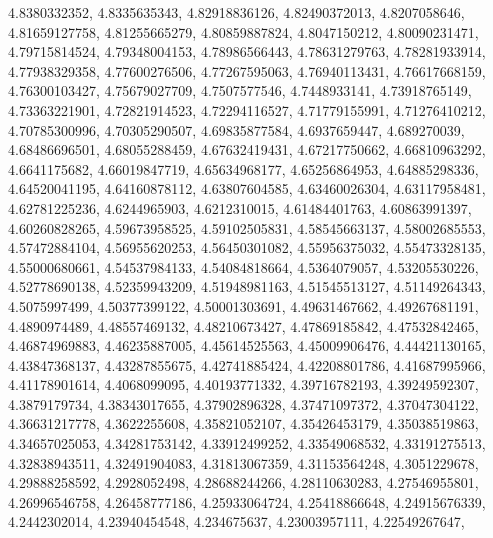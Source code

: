 \begin{code}
\begin{hide}
{      4.8380332352,      4.8335635343,     4.82918836126,
     4.82490372013,      4.8207058646,     4.81659127758,
     4.81255665279,     4.80859887824,      4.8047150212,
     4.80090231471,     4.79715814524,     4.79348004153,
     4.78986566443,     4.78631279763,     4.78281933914,
     4.77938329358,     4.77600276506,     4.77267595063,
     4.76940113431,     4.76617668159,     4.76300103427,
     4.75679027709,      4.7507577546,      4.7448933141,
     4.73918765149,     4.73363221901,     4.72821914523,
     4.72294116527,     4.71779155991,     4.71276410212,
     4.70785300996,     4.70305290507,     4.69835877584,
      4.6937659447,       4.689270039,     4.68486696501,
     4.68055288459,     4.67632419431,     4.67217750662,
     4.66810963292,      4.6641175682,     4.66019847719,
     4.65634968177,     4.65256864953,     4.64885298336,
     4.64520041195,     4.64160878112,     4.63807604585,
     4.63460026304,     4.63117958481,     4.62781225236,
      4.6244965903,      4.6212310015,     4.61484401763,
     4.60863991397,     4.60260828265,     4.59673958525,
     4.59102505831,     4.58545663137,     4.58002685553,
     4.57472884104,     4.56955620253,     4.56450301082,
     4.55956375032,     4.55473328135,     4.55000680661,
     4.54537984133,     4.54084818664,      4.5364079057,
     4.53205530226,     4.52778690138,     4.52359943209,
     4.51948981163,     4.51545513127,     4.51149264343,
      4.5075997499,     4.50377399122,     4.50001303691,
     4.49631467662,     4.49267681191,      4.4890974489,
     4.48557469132,     4.48210673427,     4.47869185842,
     4.47532842465,     4.46874969883,     4.46235887005,
     4.45614525563,     4.45009906476,     4.44421130165,
     4.43847368137,     4.43287855675,     4.42741885424,
     4.42208801786,     4.41687995966,     4.41178901614,
      4.4068099095,     4.40193771332,     4.39716782193,
     4.39249592307,      4.3879179734,     4.38343017655,
     4.37902896328,     4.37471097372,     4.37047304122,
     4.36631217778,      4.3622255608,     4.35821052107,
     4.35426453179,     4.35038519863,     4.34657025053,
     4.34281753142,     4.33912499252,     4.33549068532,
     4.33191275513,     4.32838943511,     4.32491904083,
     4.31813067359,     4.31153564248,      4.3051229678,
     4.29888258592,      4.2928052498,     4.28688244266,
     4.28110630283,     4.27546955801,     4.26996546758,
     4.26458777186,     4.25933064724,     4.25418866648,
     4.24915676339,      4.2442302014,     4.23940454548,
       4.234675637,     4.23003957111,     4.22549267647,
}
\end{hide}
\end{code}
